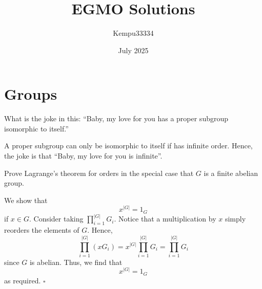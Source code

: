 \documentclass{article}
\title{EGMO Solutions}
\author{Kempu33334}
\date{July 2025}
\begin{document}
\maketitle

\tableofcontents

\newpage

\section{Groups}

\begin{problem}[1.A]
What is the joke in this: ``Baby, my love for you has a proper subgroup isomorphic to itself.''
\end{problem}
A proper subgroup can only be isomorphic to itself if has infinite order. Hence, the joke is that ``Baby, my love for you is infinite''.

\begin{problem}[1.B]
Prove Lagrange's theorem for orders in the special case that $G$ is a finite abelian group.
\end{problem}
We show that \[x^{|G|} = 1_G\] if $x \in G$. Consider taking $\prod_{i=1}^{|G|}G_i$. Notice that a multiplication by $x$ simply reorders the elements of $G$. Hence, \[\prod_{i=1}^{|G|}(xG_i) = x^{|G|}\prod_{i=1}^{|G|}G_i = \prod_{i=1}^{|G|}G_i\] since $G$ is abelian. Thus, we find that \[x^{|G|} = 1_G\] as required. $\square$
\end{document}

